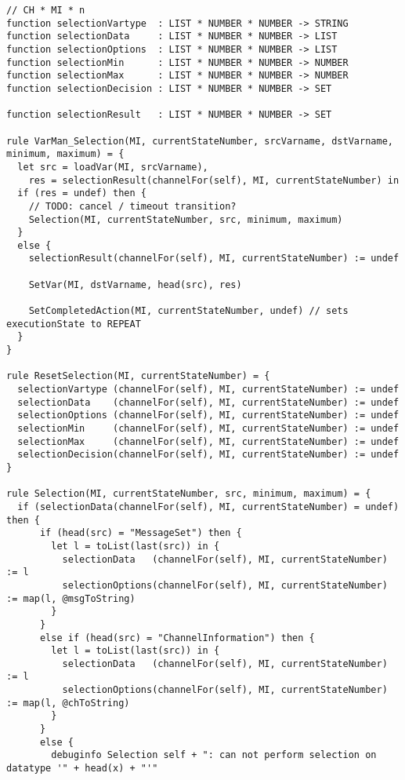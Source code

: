 \begin{listing}[H]
\begin{verbatim}
// CH * MI * n
function selectionVartype  : LIST * NUMBER * NUMBER -> STRING
function selectionData     : LIST * NUMBER * NUMBER -> LIST
function selectionOptions  : LIST * NUMBER * NUMBER -> LIST
function selectionMin      : LIST * NUMBER * NUMBER -> NUMBER
function selectionMax      : LIST * NUMBER * NUMBER -> NUMBER
function selectionDecision : LIST * NUMBER * NUMBER -> SET

function selectionResult   : LIST * NUMBER * NUMBER -> SET

rule VarMan_Selection(MI, currentStateNumber, srcVarname, dstVarname, minimum, maximum) = {
  let src = loadVar(MI, srcVarname),
    res = selectionResult(channelFor(self), MI, currentStateNumber) in
  if (res = undef) then {
    // TODO: cancel / timeout transition?
    Selection(MI, currentStateNumber, src, minimum, maximum)
  }
  else {
    selectionResult(channelFor(self), MI, currentStateNumber) := undef

    SetVar(MI, dstVarname, head(src), res)

    SetCompletedAction(MI, currentStateNumber, undef) // sets executionState to REPEAT
  }
}

rule ResetSelection(MI, currentStateNumber) = {
  selectionVartype (channelFor(self), MI, currentStateNumber) := undef
  selectionData    (channelFor(self), MI, currentStateNumber) := undef
  selectionOptions (channelFor(self), MI, currentStateNumber) := undef
  selectionMin     (channelFor(self), MI, currentStateNumber) := undef
  selectionMax     (channelFor(self), MI, currentStateNumber) := undef
  selectionDecision(channelFor(self), MI, currentStateNumber) := undef
}

rule Selection(MI, currentStateNumber, src, minimum, maximum) = {
  if (selectionData(channelFor(self), MI, currentStateNumber) = undef) then {
      if (head(src) = "MessageSet") then {
        let l = toList(last(src)) in {
          selectionData   (channelFor(self), MI, currentStateNumber) := l
          selectionOptions(channelFor(self), MI, currentStateNumber) := map(l, @msgToString)
        }
      }
      else if (head(src) = "ChannelInformation") then {
        let l = toList(last(src)) in {
          selectionData   (channelFor(self), MI, currentStateNumber) := l
          selectionOptions(channelFor(self), MI, currentStateNumber) := map(l, @chToString)
        }
      }
      else {
        debuginfo Selection self + ": can not perform selection on datatype '" + head(x) + "'"


\end{verbatim}
\end{listing}
